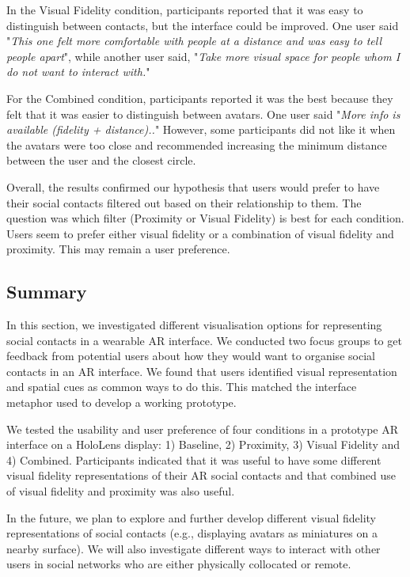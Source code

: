 In the Visual Fidelity condition, participants reported that it was easy to distinguish between contacts, but the interface could be improved. One user said "\textit{This one felt more comfortable with people at a distance and was easy to tell people apart}", while another user said, "\textit{Take more visual space for people whom I do not want to interact with.}"

For the Combined condition, participants reported it was the best because they felt that it was easier to distinguish between avatars. One user said "\textit{More info is available (fidelity + distance)..}"
However, some participants did not like it when the avatars were too close and recommended increasing the minimum distance between the user and the closest circle.

Overall, the results confirmed our hypothesis that users would prefer to have their social contacts filtered out based on their relationship to them. The question was which filter (Proximity or Visual Fidelity) is best for each condition. Users seem to prefer either visual fidelity or a combination of visual fidelity and proximity. This may remain a user preference. 

\subsection{Summary}

In this section, we investigated different visualisation options for representing social contacts in a wearable AR interface. We conducted two focus groups to get feedback from potential users about how they would want to organise social contacts in an AR interface. We found that users identified visual representation and spatial cues as common ways to do this. This matched the interface metaphor used to develop a working prototype.

We tested the usability and user preference of four conditions in a prototype AR interface on a HoloLens display: 1) Baseline, 2) Proximity, 3) Visual Fidelity and 4) Combined. Participants indicated that it was useful to have some different visual fidelity representations of their AR social contacts and that combined use of visual fidelity and proximity was also useful.

In the future, we plan to explore and further develop different visual fidelity representations of social contacts (e.g., displaying avatars as miniatures on a nearby surface). We will also investigate different ways to interact with other users in social networks who are either physically collocated or remote.
